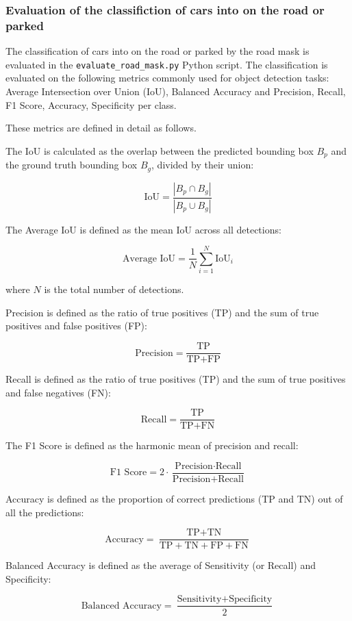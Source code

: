\subsubsection{Evaluation of the classifiction of cars into on the road or parked}
The classification of cars into on the road or parked by the road mask is evaluated in the \texttt{evaluate\_road\_mask.py} Python script.
The classification is evaluated on the following metrics commonly used for object detection tasks: Average Intersection over Union (IoU), Balanced Accuracy and Precision, Recall, F1 Score, Accuracy, Specificity per class.

These metrics are defined in detail as follows.

The IoU is calculated as the overlap between the predicted bounding box \( B_p \) and the ground truth bounding box \( B_g \), divided by their union:

\[
\text{IoU} = \frac{|B_p \cap B_g|}{|B_p \cup B_g|}
\]

The Average IoU is defined as the mean IoU across all detections:

\[
\text{Average IoU} = \frac{1}{N} \sum_{i=1}^{N} \text{IoU}_i
\]

where \( N \) is the total number of detections.

Precision is defined as the ratio of true positives (TP) and the sum of true positives and false positives (FP):

\[
\text{Precision} = \frac{\text{TP}}{\text{TP} + \text{FP}}
\]

Recall is defined as the ratio of true positives (TP) and the sum of true positives and false negatives (FN):

\[
\text{Recall} = \frac{\text{TP}}{\text{TP} + \text{FN}}
\]

The F1 Score is defined as the harmonic mean of precision and recall:

\[
\text{F1 Score} = 2 \cdot \frac{\text{Precision} \cdot \text{Recall}}{\text{Precision} + \text{Recall}}
\]

Accuracy is defined as the proportion of correct predictions (TP and TN) out of all the predictions:

\[
\text{Accuracy} = \frac{\text{TP} + \text{TN}}{\text{TP} + \text{TN} + \text{FP} + \text{FN}}
\]

Balanced Accuracy is defined as the average of Sensitivity (or Recall) and Specificity:

\[
\text{Balanced Accuracy} = \frac{\text{Sensitivity} + \text{Specificity}}{2}
\]

